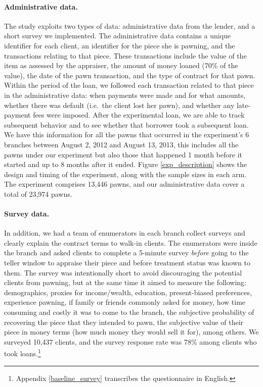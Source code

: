 \documentclass[oneside,11pt]{article}
\begin{document}
\paragraph{Administrative data.} The study exploits two types of data: administrative data from the lender, and a short survey we implemented. The administrative data contains a unique identifier for each client, an identifier for the piece she is pawning, and the transactions relating to that piece. These transactions include the value of the item as assessed by the appraiser, the amount of money loaned (70\% of the value), the date of the pawn transaction, and the type of contract for that pawn. Within the period of the loan, we followed each transaction related to that piece in the administrative data: when payments were made and for what amounts, whether there was default (i.e.\ the client lost her pawn), and whether any late-payment fees were imposed. After the experimental loan, we are able to track subsequent behavior and to see whether that borrower took a subsequent loan.  We have this information for all the pawns that occurred in the experiment's 6 branches between August 2, 2012 and August 13, 2013, this includes all the pawns under our experiment but also those that happened 1 month before it started and up to 8 months after it ended. Figure \ref{exp_description} shows the design and timing of the experiment, along with the sample sizes in each arm. The experiment comprises 13,446 pawns, and our administrative data cover a total of 23,974 pawns.

\paragraph{Survey data.} In addition, we had a team of enumerators in each branch collect surveys and clearly explain the contract terms to walk-in clients. The enumerators were inside the branch and asked clients to complete a 5-minute survey \textit{before} going to the teller window to appraise their piece and before treatment status was known to them. The survey was intentionally short to avoid discouraging the potential clients from pawning, but at the same time it aimed to measure the following: demographics, proxies for income/wealth, education, present-biased preferences, experience pawning, if family or friends commonly asked for money, how time consuming and costly it was to come to the branch, the subjective probability of recovering the piece that they intended to pawn, the subjective value of their piece in money terms (how much money they would sell it for), among others. We surveyed 10,437 clients, and the survey response rate was 78\% among clients who took loans.\footnote{Appendix \ref{baseline_survey} transcribes the questionnaire in English.} %
\end{document}
